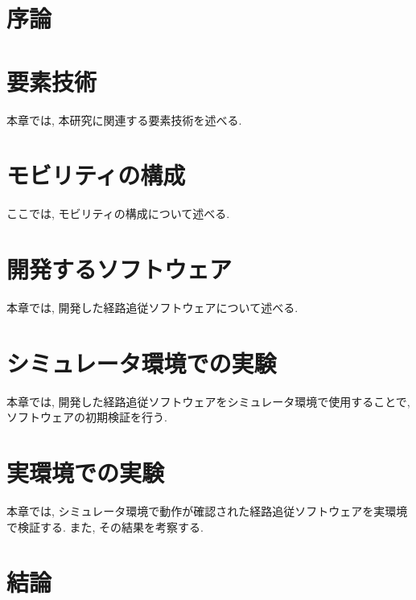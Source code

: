 \chapter{序論}
\label{chap:introduction}
%
%
%

\chapter{要素技術}
本章では, 本研究に関連する要素技術を述べる.

\chapter{モビリティの構成}
ここでは, モビリティの構成について述べる.

\chapter{開発するソフトウェア}
本章では, 開発した経路追従ソフトウェアについて述べる.

\chapter{シミュレータ環境での実験}
本章では, 開発した経路追従ソフトウェアをシミュレータ環境で使用することで, ソフトウェアの初期検証を行う.

\chapter{実環境での実験}
本章では, シミュレータ環境で動作が確認された経路追従ソフトウェアを実環境で検証する.
また, その結果を考察する.

\chapter{結論}
